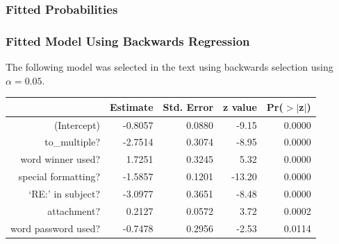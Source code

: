 \documentclass[handout]{beamer}
\begin{document}
\begin{frame}[fragile]
\frametitle{Fitted Probabilities}
%
%
\end{frame}


\begin{frame}[fragile]
\frametitle{Fitted Model Using Backwards Regression}
The following model was selected in the text using backwards selection using $\alpha=0.05$.

\begin{table}[ht]
\centering
\begin{tabular}{r|rrrr}
  \hline
 & Estimate & Std. Error & z value & Pr($>$$|$z$|$) \\ 
  \hline
(Intercept) & -0.8057 & 0.0880 & -9.15 & 0.0000 \\ 
  to\_multiple? & -2.7514 & 0.3074 & -8.95 & 0.0000 \\ 
  word winner used? & 1.7251 & 0.3245 & 5.32 & 0.0000 \\ 
  special formatting? & -1.5857 & 0.1201 & -13.20 & 0.0000 \\ 
  `RE:' in subject? & -3.0977 & 0.3651 & -8.48 & 0.0000 \\ 
  attachment? & 0.2127 & 0.0572 & 3.72 & 0.0002 \\ 
  word password used? & -0.7478 & 0.2956 & -2.53 & 0.0114 \\ 
   \hline
\end{tabular}
\end{table} 

\end{frame}
\end{document}
